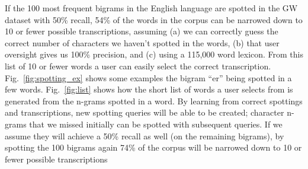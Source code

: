 \documentclass[conference]{IEEEtran}
\begin{document}
If the 100 most frequent bigrams in the English language are spotted in the GW dataset with 50\% recall, 54\% of the words in the corpus can be narrowed down to 10 or fewer possible transcriptions, assuming (a) we can correctly guess the correct number of characters we haven't spotted in the words, (b) that user oversight gives us 100\% precision, and (c) using a 115,000 word lexicon. From this list of 10 or fewer words a user can easily select the correct transcription. Fig.~\ref{fig:spotting_ex} shows some examples the bigram ``er'' being spotted in a few words. Fig.~\ref{fig:list} shows how the short list of words a user selects from is generated from the n-grams spotted in a word. By learning from correct spottings and transcriptions, new spotting queries will be able to be created; character n-grams that we missed initially can be spotted with subsequent queries. If we assume they will achieve a 50\% recall as well (on the remaining bigrams), by spotting the 100 bigrams again 74\% of the corpus will be narrowed down to 10 or fewer possible transcriptions
\end{document}
